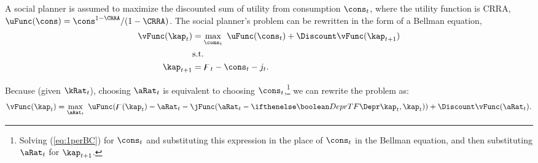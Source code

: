 A social planner is assumed to maximize the discounted sum of
utility from consumption $\cons_{t}$, where the utility function is CRRA, $\uFunc(\cons )=\cons^{1-\CRRA}/(1-\CRRA)$.
The social planner's problem can be rewritten in the form of a Bellman equation,
\begin{equation}\begin{gathered}\begin{aligned}
\vFunc(\kap_t) &= %
\max_{\cons_t} ~\uFunc(\cons_t)+\Discount \vFunc(\kap_{t+1})
\\ & \text{s.t.}  \notag
\\ \kap_{t+1} & =  \digamma_t-\cons_t-j_t.
\end{aligned}\end{gathered}\end{equation}

Because (given $\kRat_{t}$), choosing $\aRat_t$ is equivalent to choosing $\cons_t$,\footnote{Solving
  (\ref{eq:1perBC}) for $\cons_t$ and substituting this expression in
  the place of $\cons_t$ in the Bellman equation, and then
  substituting $\aRat_t$ for $\kap_{t+1}$.} we can rewrite
the problem as:
\begin{equation}
\vFunc(\kap_{t})=\max_{\aRat_{t}}
~\uFunc(\digamma(\kap_{t})-\aRat_{t}-\jFunc(\aRat_{t}-\ifDepr{\Depr}{}\kap_{t},\kap_{t}))+\Discount
\vFunc(\aRat_{t})\label{eq:aEnd}.
\end{equation}

